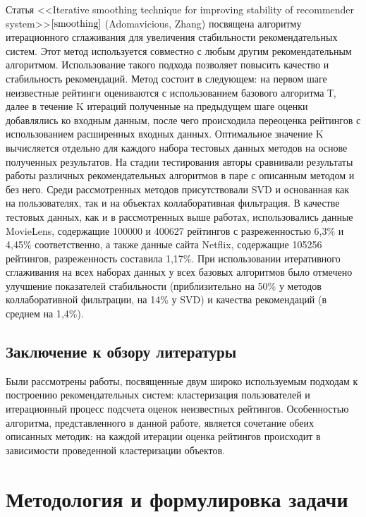 \documentclass[a4paper, 12pt]{article} %
\begin{document}
\par
Статья <<Iterative smoothing technique for improving stability of recommender system>>$\cite{smoothing}$ (Adomavicious, Zhang) посвящена алгоритму итерационного сглаживания для увеличения стабильности рекомендательных систем. Этот метод используется совместно с любым другим рекомендательным алгоритмом. Использование такого подхода позволяет повысить качество и стабильность рекомендаций. Метод состоит в следующем: на первом шаге неизвестные рейтинги оцениваются с использованием базового алгоритма Т, далее в течение K итераций полученные на предыдущем шаге оценки добавлялись ко входным данным, после чего происходила переоценка рейтингов с использованием расширенных входных данных. Оптимальное значение K вычисляется отдельно для каждого набора тестовых данных методов на основе полученных результатов. На стадии тестирования авторы сравнивали результаты работы различных рекомендательных алгоритмов в паре с описанным методом и без него. Среди рассмотренных методов присутствовали SVD и основанная как на пользователях, так и на объектах коллаборативная фильтрация. В качестве тестовых данных, как и в рассмотренных выше работах, использовались данные MovieLens, содержащие 100000 и 400627 рейтингов с разреженностью 6,3\% и 4,45\% соответственно, а также данные сайта Netflix, содержащие 105256 рейтингов, разреженность составила 1,17\%. При использовании итеративного сглаживания на всех наборах данных у всех базовых алгоритмов было отмечено улучшение показателей стабильности (приблизительно на 50\% у методов коллаборативной фильтрации, на 14\% у SVD) и качества рекомендаций (в среднем на 1,4\%). 

\subsection{Заключение к обзору литературы}
Были рассмотрены работы, посвященные двум широко используемым подходам к построению рекомендательных систем: кластеризация пользователей и итерационный процесс подсчета оценок неизвестных рейтингов. Особенностью алгоритма, представленного в данной работе, является сочетание обеих описанных методик: на каждой итерации оценка рейтингов происходит в зависимости проведенной кластеризации объектов. 


\section{Методология и формулировка задачи}
\end{document}
